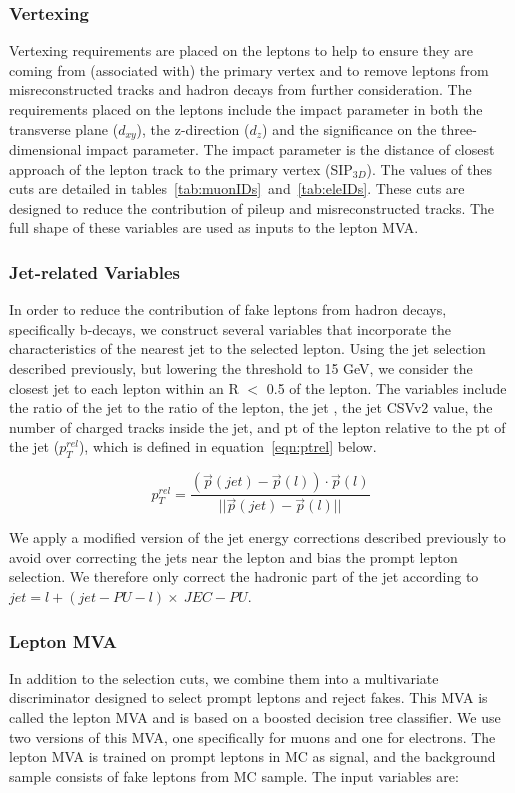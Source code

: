 \subsubsection{Vertexing}
Vertexing requirements are placed on the leptons to help to ensure they are coming from (associated with) the primary vertex and to
remove leptons from misreconstructed tracks and hadron decays from further consideration. The requirements
placed on the leptons include the impact parameter in both the transverse plane ($d_{xy}$), the z-direction ($d_{z}$) and the significance
on the three-dimensional impact parameter. The impact parameter is the distance of closest approach of the lepton track to the primary vertex
(SIP$_{3D}$). The values of thes cuts are detailed in tables~\ref{tab:muonIDs}~and~\ref{tab:eleIDs}.
These cuts are designed to reduce the contribution of pileup and misreconstructed tracks. The full shape of these variables are
used as inputs to the lepton MVA.

\subsubsection{Jet-related Variables}
In order to reduce the contribution of fake leptons from hadron decays, specifically b-decays, we construct several variables that incorporate
the characteristics of the nearest jet to the selected lepton. Using the jet selection described previously, but lowering the \pt threshold to
15 GeV, we consider the closest jet to each lepton within an R $<$ 0.5 of the lepton. The variables include the ratio of the jet to the ratio
of the lepton, the jet \pt, the jet CSVv2 value, the number of charged tracks inside the jet, and pt of the lepton relative to the pt of the jet
($p_{T}^{rel}$), which is defined in equation~\ref{eqn:ptrel} below. 

\begin{equation}
\label{eqn:ptrel}
 p_{T}^{rel} = \frac{(\vec{p}(jet)-\vec{p}(l))\cdot\vec{p}(l)}{||\vec{p}(jet)-\vec{p}(l)||}
\end{equation}

We apply a modified version of the jet energy corrections described previously to avoid over correcting the jets near the lepton and bias the 
prompt lepton selection. We therefore only correct the hadronic part of the jet according to $jet = l + (jet-PU-l)\times~JEC - PU$.  

\subsubsection{Lepton MVA}
In addition to the selection cuts, we combine them into a multivariate discriminator designed to select prompt leptons and reject fakes.
This MVA is called the lepton MVA and is based on a boosted decision tree classifier. We use two versions of this MVA, one specifically for
muons and one for electrons. The lepton MVA is trained on prompt leptons in \tth
MC as signal, and the background sample consists of fake leptons from \ttbar MC sample. The input variables are: 

